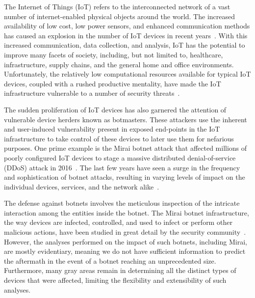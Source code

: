 The Internet of Things (IoT) refers to the interconnected network of a vast number of internet-enabled physical objects around the world. The increased availability of low cost, low power sensors, and enhanced communication methods has caused an explosion in the number of IoT devices in recent years~\cite{atzori2010_IoT_Survey}. With this increased communication, data collection, and analysis, IoT has the potential to improve many facets of society, including, but not limited to, healthcare, infrastructure, supply chains, and the general home and office environments. Unfortunately, the relatively low computational resources available for typical IoT devices, coupled with a rushed productive mentality, have made the IoT infrastructure vulnerable to a number of security threats~\cite{alaba2017_IoT_Security_Survey}.

The sudden proliferation of IoT devices has also garnered the attention of vulnerable device herders known as botmasters. These attackers use the inherent and user-induced vulnerability present in exposed end-points in the IoT infrastructure to take control of these devices to later use them for nefarious purposes. One prime example is the Mirai botnet attack that affected millions of poorly configured IoT devices to stage a massive distributed denial-of-service (DDoS) attack in 2016~\cite{bertino2017_Botnets_IoT}. The last few years have seen a surge in the frequency and sophistication of botnet attacks, resulting in varying levels of impact on the individual devices, services, and the network alike~\cite{kolias2017_Mirai_DDoS, kambourakis2017mirai}.

The defense against botnets involves the meticulous inspection of the intricate interaction among the entities inside the botnet. The Mirai botnet infrastructure, the way devices are infected, controlled, and used to infect or perform other malicious actions, have been studied in great detail by the security community~\cite{kolias2017_Mirai_DDoS, Antonakakis2017_USENIX_Mirai_First_Study}. However, the analyses performed on the impact of such botnets, including Mirai, are mostly evidentiary, meaning we do not have sufficient information to predict the aftermath in the event of a botnet reaching an unprecedented size. Furthermore, many gray areas remain in determining all the distinct types of devices that were affected, limiting the flexibility and extensibility of such analyses.

